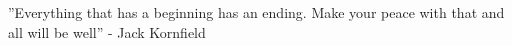 ''Everything that has a beginning has an ending. Make your peace with that and all will be well'' - Jack Kornfield
